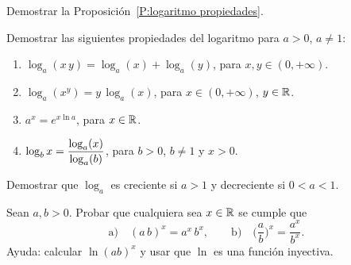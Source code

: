\item Demostrar la Proposición~\ref{P:logaritmo propiedades}.

\item Demostrar las siguientes propiedades del logaritmo para $a>0$, $a\neq 1$:
\begin{enumerate}
    \item $\log_a (x\, y) = \log_a(x) + \log_a(y)$, para $x,y\in(0,+\infty)$.
    \item $\log_a (x^ y) = y \, \log_a(x)$, para $x\in(0,+\infty)$, $y\in\mathbb{R}$.
    \item $a^x = e^{x \ln a}$, para $x\in\mathbb{R}$.
    \item $\displaystyle\log_b x = \frac{\log_a(x)}{\log_a(b)}$, para $b>0$, $b\neq 1$ y $x>0$.
\end{enumerate}

\item Demostrar que $\log_a$ es creciente si $a>1$ y decreciente si $0<a<1$.

\item Sean $a,b > 0$. Probar que cualquiera sea $x \in \mathbb{R}$ se cumple que
\[
\text{a)}\quad (a\,b)^x = a^x\,b^x,
\qquad
\text{b)}\quad \Big(\frac ab\Big)^x = \frac{a^x}{b^x}.
\]
Ayuda: calcular $\ln(ab)^x$ y usar que $\ln$ es una función inyectiva.

